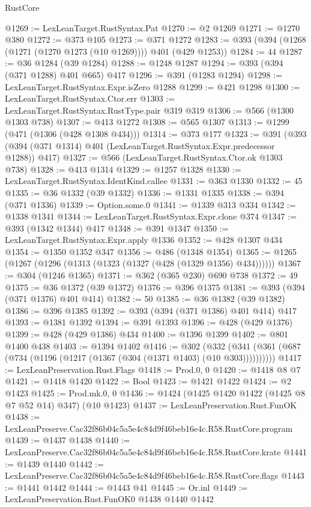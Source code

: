 \begin{lexlean}{RustCore}
\begin{coremodule}
@1269 := LexLeanTarget.RustSyntax.Pat
@1270 := @2 @1269
@1271 := @1270 @380
@1272 := @373 @105
@1273 := @371 @1272
@1283 := @393 (@394 (@1268 (@1271 (@1270 @1273 (@10 @1269)))) @401 (@429 @1253))
@1284 := 44
@1287 := @36 @1284 (@39 @1284)
@1288 := @1248 @1287
@1294 := @393 (@394 (@371 @1288) @401 @665) @417
@1296 := @391 (@1283 @1294)
@1298 := LexLeanTarget.RustSyntax.Expr.isZero @1288
@1299 := @421 @1298
@1300 := LexLeanTarget.RustSyntax.Ctor.err
@1303 := LexLeanTarget.RustSyntax.RustType.pair @319 @319
@1306 := @566 (@1300 @1303 @738)
@1307 := @413 @1272
@1308 := @565 @1307
@1313 := @1299 (@471 (@1306 (@428 @1308 @434)))
@1314 := @373 @177
@1323 := @391 (@393 (@394 (@371 @1314) @401 (LexLeanTarget.RustSyntax.Expr.predecessor @1288)) @417)
@1327 := @566 (LexLeanTarget.RustSyntax.Ctor.ok @1303 @738)
@1328 := @413 @1314
@1329 := @1257 @1328
@1330 := LexLeanTarget.RustSyntax.IdentKind.callee
@1331 := @363 @1330
@1332 := 45
@1335 := @36 @1332 (@39 @1332)
@1336 := @1331 @1335
@1338 := @394 (@371 @1336)
@1339 := Option.some.{0}
@1341 := @1339 @313 @334
@1342 := @1338 @1341
@1344 := LexLeanTarget.RustSyntax.Expr.clone @374
@1347 := @393 (@1342 @1344) @417
@1348 := @391 @1347
@1350 := LexLeanTarget.RustSyntax.Expr.apply @1336
@1352 := @428 @1307 @434
@1354 := @1350 @1352 @347
@1356 := @486 (@1348 @1354)
@1365 := @1265 (@1267 (@1296 (@1313 (@1323 (@1327 (@428 (@1329 @1356) @434))))))
@1367 := @304 (@1246 @1365)
@1371 := @362 (@365 @230) @690 @738
@1372 := 49
@1375 := @36 @1372 (@39 @1372)
@1376 := @396 @1375
@1381 := @393 (@394 (@371 @1376) @401 @414)
@1382 := 50
@1385 := @36 @1382 (@39 @1382)
@1386 := @396 @1385
@1392 := @393 (@394 (@371 @1386) @401 @414) @417
@1393 := @1381 @1392
@1394 := @391 @1393
@1396 := @428 (@429 @1376)
@1399 := @428 (@429 @1386) @434
@1400 := @1396 @1399
@1402 := @801 @1400 @438
@1403 := @1394 @1402
@1416 := @302
    (@332 (@341 (@361 (@687 (@734 (@1196 (@1217 (@1367 (@304 (@1371 @1403) (@10 @303))))))))))
@1417 := LexLeanPreservation.Rust.Flags
@1418 := Prod.{0, 0}
@1420 := @1418 @8 @7
@1421 := @1418 @1420
@1422 := Bool
@1423 := @1421 @1422
@1424 := @2 @1423
@1425 := Prod.mk.{0, 0}
@1436 := @1424 (@1425 @1420 @1422 (@1425 @8 @7 @52 @14) @347) (@10 @1423)
@1437 := LexLeanPreservation.Rust.FunOK
@1438 := LexLeanPreserve.Cac32f86b04c5a5e4c84d9f46beb16e4c.R58.RustCore.program
@1439 := @1437 @1438
@1440 := LexLeanPreserve.Cac32f86b04c5a5e4c84d9f46beb16e4c.R58.RustCore.krate
@1441 := @1439 @1440
@1442 := LexLeanPreserve.Cac32f86b04c5a5e4c84d9f46beb16e4c.R58.RustCore.flags
@1443 := @1441 @1442
@1444 := @1443 @41
@1445 := Or.inl
@1449 := LexLeanPreservation.Rust.FunOK0 @1438 @1440 @1442

\end{coremodule}
\end{lexlean}
